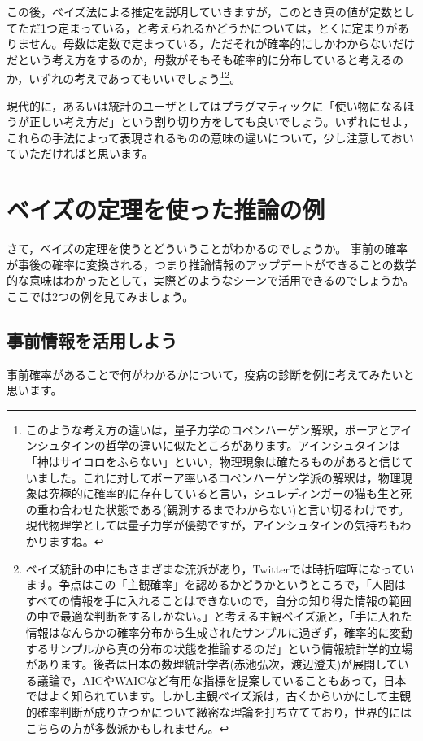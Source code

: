 \documentclass{ltjsbook}
\begin{document}
この後，ベイズ法による推定を説明していきますが，このとき真の値が定数としてただ1つ定まっている，と考えられるかどうかについては，とくに定まりがありません。母数は定数で定まっている，ただそれが確率的にしかわからないだけだという考え方をするのか，母数がそもそも確率的に分布していると考えるのか，いずれの考えであってもいいでしょう\footnote{このような考え方の違いは，量子力学のコペンハーゲン解釈，ボーアとアインシュタインの哲学の違いに似たところがあります。アインシュタインは「神はサイコロをふらない」といい，物理現象は確たるものがあると信じていました。これに対してボーア率いるコペンハーゲン学派の解釈は，物理現象は究極的に確率的に存在していると言い，シュレディンガーの猫も生と死の重ね合わせた状態である(観測するまでわからない)と言い切るわけです。現代物理学としては量子力学が優勢ですが，アインシュタインの気持ちもわかりますね。}\footnote{ベイズ統計の中にもさまざまな流派があり，Twitterでは時折喧嘩になっています。争点はこの「主観確率」を認めるかどうかというところで，「人間はすべての情報を手に入れることはできないので，自分の知り得た情報の範囲の中で最適な判断をするしかない。」と考える主観ベイズ派と，「手に入れた情報はなんらかの確率分布から生成されたサンプルに過ぎず，確率的に変動するサンプルから真の分布の状態を推論するのだ」という情報統計学的立場があります。後者は日本の数理統計学者(赤池弘次，渡辺澄夫)が展開している議論で，AICやWAICなど有用な指標を提案していることもあって，日本ではよく知られています。しかし主観ベイズ派は，古くからいかにして主観的確率判断が成り立つかについて緻密な理論を打ち立てており，世界的にはこちらの方が多数派かもしれません。}。

現代的に，あるいは統計のユーザとしてはプラグマティックに「使い物になるほうが正しい考え方だ」という割り切り方をしても良いでしょう。いずれにせよ，これらの手法によって表現されるものの意味の違いについて，少し注意しておいていただければと思います。

\section{ベイズの定理を使った推論の例}
さて，ベイズの定理を使うとどういうことがわかるのでしょうか。
事前の確率が事後の確率に変換される，つまり推論情報のアップデートができることの数学的な意味はわかったとして，実際どのようなシーンで活用できるのでしょうか。
ここでは2つの例を見てみましょう。

\subsection{事前情報を活用しよう}
事前確率があることで何がわかるかについて，疫病の診断を例に考えてみたいと思います。
\end{document}
